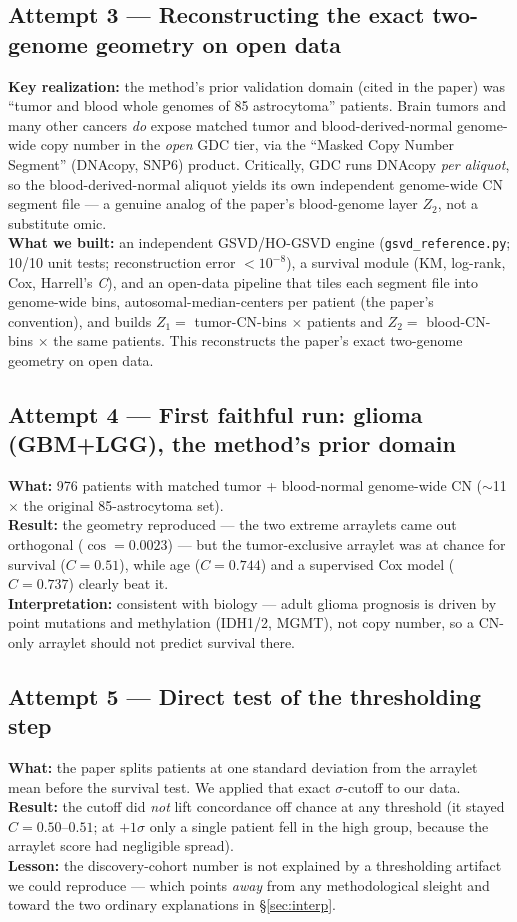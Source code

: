 \documentclass[11pt]{article}
\newcommand{\C}{\textit{C}}
\begin{document}
\subsection{Attempt 3 --- Reconstructing the exact two-genome geometry on open data}
\textbf{Key realization:} the method's prior validation domain (cited in the paper)
was ``tumor and blood whole genomes of 85 astrocytoma'' patients. Brain tumors and
many other cancers \emph{do} expose matched tumor and blood-derived-normal
genome-wide copy number in the \emph{open} GDC tier, via the ``Masked Copy Number
Segment'' (DNAcopy, SNP6) product. Critically, GDC runs DNAcopy \emph{per
aliquot}, so the blood-derived-normal aliquot yields its own independent
genome-wide CN segment file --- a genuine analog of the paper's blood-genome layer
$Z_2$, not a substitute omic.\\
\textbf{What we built:} an independent GSVD/HO-GSVD engine
(\texttt{gsvd\_reference.py}; 10/10 unit tests; reconstruction error $<10^{-8}$),
a survival module (KM, log-rank, Cox, Harrell's \C), and an open-data pipeline
that tiles each segment file into genome-wide bins, autosomal-median-centers per
patient (the paper's convention), and builds
$Z_1=$ tumor-CN-bins $\times$ patients and $Z_2=$ blood-CN-bins $\times$ the same
patients. This reconstructs the paper's exact two-genome geometry on open data.

\subsection{Attempt 4 --- First faithful run: glioma (GBM+LGG), the method's prior domain}
\textbf{What:} 976 patients with matched tumor + blood-normal genome-wide CN
($\sim$11$\times$ the original 85-astrocytoma set).\\
\textbf{Result:} the geometry reproduced --- the two extreme arraylets came out
orthogonal ($\cos=0.0023$) --- but the tumor-exclusive arraylet was at chance for
survival ($\C=0.51$), while age ($\C=0.744$) and a supervised Cox model
($\C=0.737$) clearly beat it.\\
\textbf{Interpretation:} consistent with biology --- adult glioma prognosis is
driven by point mutations and methylation (IDH1/2, MGMT), not copy number, so a
CN-only arraylet should not predict survival there.

\subsection{Attempt 5 --- Direct test of the thresholding step}
\textbf{What:} the paper splits patients at one standard deviation from the
arraylet mean before the survival test. We applied that exact $\sigma$-cutoff to
our data.\\
\textbf{Result:} the cutoff did \emph{not} lift concordance off chance at any
threshold (it stayed $\C=0.50$--$0.51$; at $+1\sigma$ only a single patient fell
in the high group, because the arraylet score had negligible spread).\\
\textbf{Lesson:} the discovery-cohort number is not explained by a thresholding
artifact we could reproduce --- which points \emph{away} from any methodological
sleight and toward the two ordinary explanations in \S\ref{sec:interp}.
\end{document}
